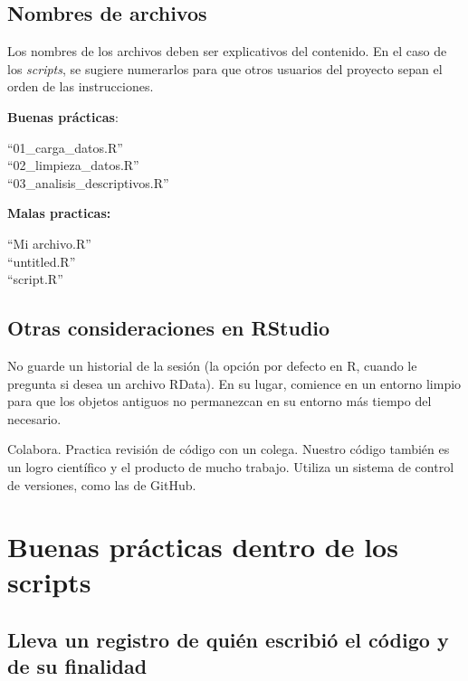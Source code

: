 \documentclass[
]{book}
\begin{document}
\hypertarget{nombres-de-archivos}{%
\subsection{Nombres de archivos}\label{nombres-de-archivos}}

Los nombres de los archivos deben ser explicativos del contenido. En el caso de los \emph{scripts}, se sugiere numerarlos para que otros usuarios del proyecto sepan el orden de las instrucciones.

\textbf{Buenas prácticas}:

``01\_carga\_datos.R''\\
``02\_limpieza\_datos.R''\\
``03\_analisis\_descriptivos.R''

\textbf{Malas practicas:}

``Mi archivo.R''\\
``untitled.R''\\
``script.R''

\hypertarget{otras-consideraciones-en-rstudio}{%
\subsection{Otras consideraciones en RStudio}\label{otras-consideraciones-en-rstudio}}

No guarde un historial de la sesión (la opción por defecto en R, cuando le pregunta si desea un archivo RData). En su lugar, comience en un entorno limpio para que los objetos antiguos no permanezcan en su entorno más tiempo del necesario.

Colabora. Practica revisión de código con un colega. Nuestro código también es un logro científico y el producto de mucho trabajo. Utiliza un sistema de control de versiones, como las de GitHub.

\hypertarget{buenas-pruxe1cticas-dentro-de-los-scripts}{%
\section{Buenas prácticas dentro de los scripts}\label{buenas-pruxe1cticas-dentro-de-los-scripts}}

\hypertarget{lleva-un-registro-de-quiuxe9n-escribiuxf3-el-cuxf3digo-y-de-su-finalidad}{%
\subsection{\texorpdfstring{\textbf{Lleva un registro de quién escribió el código y de su finalidad}}{Lleva un registro de quién escribió el código y de su finalidad}}\label{lleva-un-registro-de-quiuxe9n-escribiuxf3-el-cuxf3digo-y-de-su-finalidad}}
\end{document}
